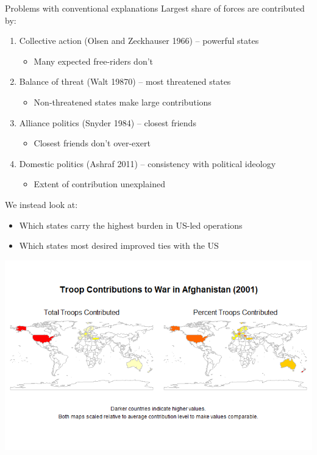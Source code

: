 \documentclass[11pt]{beamer}
\begin{document}
\begin{frame}{Problems with conventional explanations}
  Largest share of forces are contributed by:
  \begin{enumerate}
    \item Collective action (Olsen and Zeckhauser 1966) -- powerful states
      \begin{itemize}
        \item Many expected free-riders don't
      \end{itemize}
    \item Balance of threat (Walt 19870) -- most threatened states
      \begin{itemize}
        \item Non-threatened states make large contributions
      \end{itemize}
    \item Alliance politics (Snyder 1984) -- closest friends
      \begin{itemize}
        \item Closest friends don't over-exert
      \end{itemize}
    \item Domestic politics (Ashraf 2011) -- consistency with political ideology
      \begin{itemize}
        \item Extent of contribution unexplained
      \end{itemize}
  \end{enumerate}
\end{frame}

\begin{frame}{We instead look at:}
  \begin{itemize}
    \item Which states carry the highest burden in US-led operations
    \item Which states most desired improved ties with the US
  \end{itemize}
\end{frame}

\begin{frame}
  \includegraphics[scale = 0.45]{troops_2001_sidebyside_scaled.png}
\end{frame}
\end{document}
